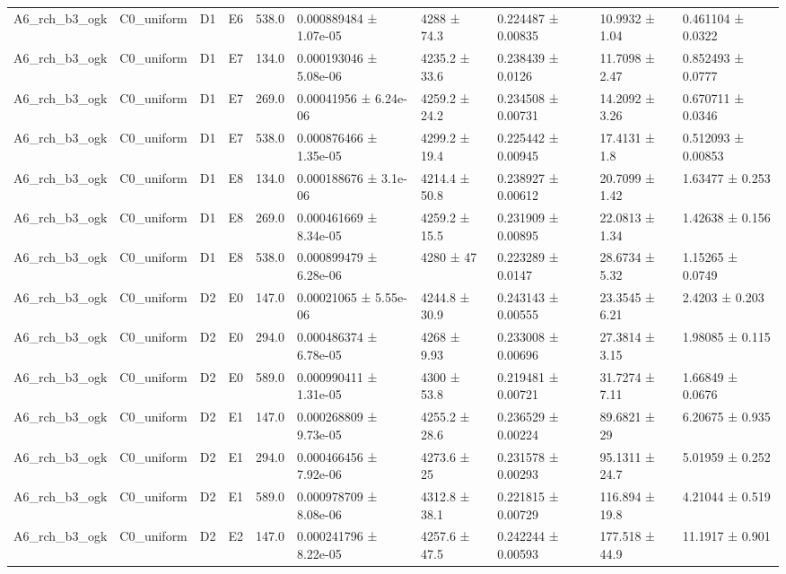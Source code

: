 \begin{table}
\begin{tabular}{llllllllll}
A6\_rch\_b3\_ogk & C0\_uniform & D1 & E6 & 538.0 & 0.000889484 ± 1.07e-05 & 4288 ± 74.3 & 0.224487 ± 0.00835 & 10.9932 ± 1.04 & 0.461104 ± 0.0322 \\
A6\_rch\_b3\_ogk & C0\_uniform & D1 & E7 & 134.0 & 0.000193046 ± 5.08e-06 & 4235.2 ± 33.6 & 0.238439 ± 0.0126 & 11.7098 ± 2.47 & 0.852493 ± 0.0777 \\
A6\_rch\_b3\_ogk & C0\_uniform & D1 & E7 & 269.0 & 0.00041956 ± 6.24e-06 & 4259.2 ± 24.2 & 0.234508 ± 0.00731 & 14.2092 ± 3.26 & 0.670711 ± 0.0346 \\
A6\_rch\_b3\_ogk & C0\_uniform & D1 & E7 & 538.0 & 0.000876466 ± 1.35e-05 & 4299.2 ± 19.4 & 0.225442 ± 0.00945 & 17.4131 ± 1.8 & 0.512093 ± 0.00853 \\
A6\_rch\_b3\_ogk & C0\_uniform & D1 & E8 & 134.0 & 0.000188676 ± 3.1e-06 & 4214.4 ± 50.8 & 0.238927 ± 0.00612 & 20.7099 ± 1.42 & 1.63477 ± 0.253 \\
A6\_rch\_b3\_ogk & C0\_uniform & D1 & E8 & 269.0 & 0.000461669 ± 8.34e-05 & 4259.2 ± 15.5 & 0.231909 ± 0.00895 & 22.0813 ± 1.34 & 1.42638 ± 0.156 \\
A6\_rch\_b3\_ogk & C0\_uniform & D1 & E8 & 538.0 & 0.000899479 ± 6.28e-06 & 4280 ± 47 & 0.223289 ± 0.0147 & 28.6734 ± 5.32 & 1.15265 ± 0.0749 \\
A6\_rch\_b3\_ogk & C0\_uniform & D2 & E0 & 147.0 & 0.00021065 ± 5.55e-06 & 4244.8 ± 30.9 & 0.243143 ± 0.00555 & 23.3545 ± 6.21 & 2.4203 ± 0.203 \\
A6\_rch\_b3\_ogk & C0\_uniform & D2 & E0 & 294.0 & 0.000486374 ± 6.78e-05 & 4268 ± 9.93 & 0.233008 ± 0.00696 & 27.3814 ± 3.15 & 1.98085 ± 0.115 \\
A6\_rch\_b3\_ogk & C0\_uniform & D2 & E0 & 589.0 & 0.000990411 ± 1.31e-05 & 4300 ± 53.8 & 0.219481 ± 0.00721 & 31.7274 ± 7.11 & 1.66849 ± 0.0676 \\
A6\_rch\_b3\_ogk & C0\_uniform & D2 & E1 & 147.0 & 0.000268809 ± 9.73e-05 & 4255.2 ± 28.6 & 0.236529 ± 0.00224 & 89.6821 ± 29 & 6.20675 ± 0.935 \\
A6\_rch\_b3\_ogk & C0\_uniform & D2 & E1 & 294.0 & 0.000466456 ± 7.92e-06 & 4273.6 ± 25 & 0.231578 ± 0.00293 & 95.1311 ± 24.7 & 5.01959 ± 0.252 \\
A6\_rch\_b3\_ogk & C0\_uniform & D2 & E1 & 589.0 & 0.000978709 ± 8.08e-06 & 4312.8 ± 38.1 & 0.221815 ± 0.00729 & 116.894 ± 19.8 & 4.21044 ± 0.519 \\
A6\_rch\_b3\_ogk & C0\_uniform & D2 & E2 & 147.0 & 0.000241796 ± 8.22e-05 & 4257.6 ± 47.5 & 0.242244 ± 0.00593 & 177.518 ± 44.9 & 11.1917 ± 0.901 \\

\end{tabular}
\end{table}

